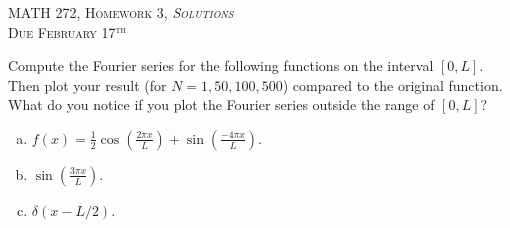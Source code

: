 \documentclass[12pt]{article} %
\begin{document}
\begin{center}
   \textsc{\large MATH 272, Homework 3, \emph{Solutions}}\\
   \textsc{Due February 17$^\textrm{th}$}
\end{center}
\vspace{.5cm}


\begin{problem}
Compute the Fourier series for the following functions on the interval $[0,L]$. Then plot your result (for $N=1,50,100,500$) compared to the original function. What do you notice if you plot the Fourier series outside the range of $[0,L]$?
\begin{enumerate}[(a)]
	\item $f(x)=\frac{1}{2}\cos\left(\frac{2\pi x}{L}\right)+\sin\left(\frac{-4\pi x}{L}\right)$.
	\item $\sin\left(\frac{3\pi x}{L}\right)$.
	\item $\delta(x-L/2)$.
\end{enumerate}
\end{problem}
\end{document}
